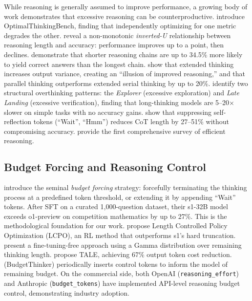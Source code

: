 \documentclass[11pt]{article}
\begin{document}
While reasoning is generally assumed to improve performance, a growing body of work demonstrates that excessive reasoning can be counterproductive. \citet{aggarwal2025optimal} introduce OptimalThinkingBench, finding that independently optimizing for one metric degrades the other. \citet{su2025between} reveal a non-monotonic \emph{inverted-U} relationship between reasoning length and accuracy: performance improves up to a point, then declines. \citet{hassid2025dont} demonstrate that shorter reasoning chains are up to 34.5\% more likely to yield correct answers than the longest chain. \citet{yang2025mirage} show that extended thinking increases output variance, creating an ``illusion of improved reasoning,'' and that parallel thinking outperforms extended serial thinking by up to 20\%. \citet{zhang2025structural} identify two structural overthinking patterns: the \emph{Explorer} (excessive exploration) and \emph{Late Landing} (excessive verification), finding that long-thinking models are 5--20$\times$ slower on simple tasks with no accuracy gains. \citet{wang2025nowait} show that suppressing self-reflection tokens (``Wait'', ``Hmm'') reduces CoT length by 27--51\% without compromising accuracy. \citet{sui2025stop} provide the first comprehensive survey of efficient reasoning.

\subsection{Budget Forcing and Reasoning Control}

\citet{muennighoff2025s1} introduce the seminal \emph{budget forcing} strategy: forcefully terminating the thinking process at a predefined token threshold, or extending it by appending ``Wait'' tokens. After SFT on a curated 1,000-question dataset, their s1-32B model exceeds o1-preview on competition mathematics by up to 27\%. This is the methodological foundation for our work. \citet{aggarwal2025l1} propose Length Controlled Policy Optimization (LCPO), an RL method that outperforms s1's hard truncation. \citet{li2025steering} present a fine-tuning-free approach using a Gamma distribution over remaining thinking length. \citet{han2025token} propose TALE, achieving 67\% output token cost reduction. \citet{wen2025budgetthinker} (BudgetThinker) periodically inserts control tokens to inform the model of remaining budget. On the commercial side, both OpenAI (\texttt{reasoning\_effort}) and Anthropic (\texttt{budget\_tokens}) have implemented API-level reasoning budget control, demonstrating industry adoption.
\end{document}
